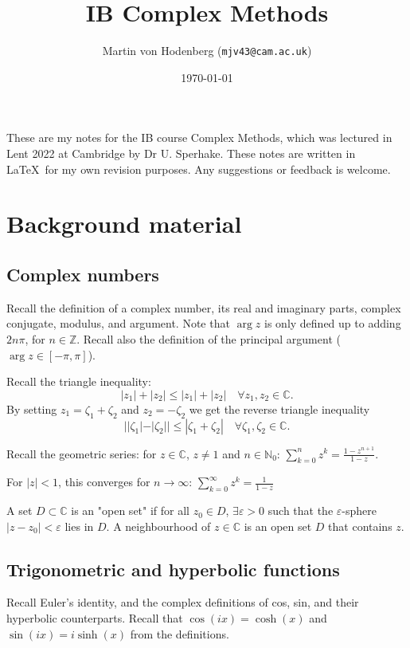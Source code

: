 \documentclass[a4paper]{scrartcl}
\title{IB Complex Methods}
\author{Martin von Hodenberg (\texttt{mjv43@cam.ac.uk})}
\date{\today}
\begin{document}
\maketitle

These are my notes for the IB course Complex Methods, which was lectured in Lent 2022 at Cambridge by Dr U. Sperhake. These notes are written in \LaTeX  \ for my own revision purposes. Any suggestions or feedback is welcome.



\tableofcontents
\newpage

\section{Background material}
\subsection{Complex numbers}
Recall the definition of a complex number, its real and imaginary parts, complex conjugate, modulus, and argument. Note that $\operatorname{arg} z$ is only defined up to adding $2n \pi$, for $n \in \mathbb{Z}$. Recall also the definition of the principal argument ($\operatorname{arg}z \in [- \pi, \pi]$). 

Recall the triangle inequality: \[
|z_1 |+|z_2 | \leq |z_1 |+ |z_2 | \quad \forall z_1 , z_2 \in \mathbb{C}
.\] 
By setting $z_1 = \zeta_1 +\zeta_2 $ and $z_2 =-\zeta_2 $ we get the reverse triangle inequality \[
||\zeta_1 |- |\zeta_2 ||\leq |\zeta_1 +\zeta_2 | \quad \forall \zeta_1 , \zeta_2 \in \mathbb{C}
.\] 

Recall the geometric series: for $z \in \mathbb{C}$, $z \neq 1$ and $n \in \mathbb{N}_0$: $\sum_{k=0}^{n}z^{k}= \frac{1-z^{n+1}}{1-z}$. 

For $|z|<1$, this converges for $n \rightarrow \infty$: $\sum_{k=0}^{ \infty}z^{k}= \frac{1}{1-z}$

\begin{definition*}
     A set $D \subset \mathbb{C}$ is an "open set" if for all $z_0 \in D$, $\exists \varepsilon>0$ such that the $\varepsilon$-sphere $|z-z_0 |<\varepsilon$ lies in $D$. A neighbourhood of $z \in \mathbb{C}$ is an open set $D$ that contains $z$. 
\end{definition*}

\subsection{Trigonometric and hyperbolic functions}
Recall Euler's identity, and the complex definitions of cos, sin, and their hyperbolic counterparts. Recall that $\cos (ix)=\cosh (x)$  and $\sin (ix)= i \sinh (x)$ from the definitions.
\end{document}
